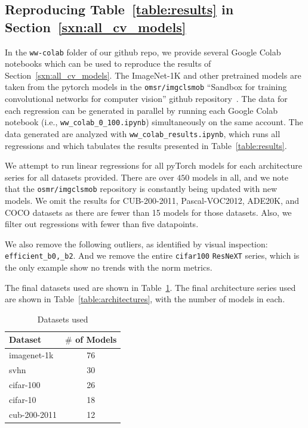 \subsection{Reproducing Table~\ref{table:results} in Section~\ref{sxn:all_cv_models} }

In the \texttt{ww-colab} folder of our github repo, we provide several Google Colab notebooks which can be used to reproduce the results of Section~\ref{sxn:all_cv_models}.
The ImageNet-1K and other pretrained models are taken from the pytorch models in the \texttt{omsr/imgclsmob} 
``Sandbox for training convolutional networks for computer vision'' github repository~\cite{osmr}.
The data for each regression can be generated in parallel by running each Google Colab notebook (i.e., \texttt{ww\_colab\_0\_100.ipynb}) simultaneously on the same account.
The data generated are analyzed with \texttt{ww\_colab\_results.ipynb}, which runs all regressions and which tabulates the results presented in Table~\ref{table:results}.

We attempt to run linear regressions for all pyTorch models for each architecture series for all datasets provided.  
There are over $450$ models in all, and we note that the \texttt{osmr/imgclsmob} repository is constantly being updated with new models.
We omit the results for CUB-200-2011, Pascal-VOC2012, ADE20K, and COCO datasets as there are fewer than 15 models for those datasets.  
Also, we filter out regressions with fewer than five datapoints.

We also remove the following outliers, as identified by visual inspection: \texttt{efficient\_b0,\_b2}.
And we remove the entire \texttt{cifar100} \texttt{ResNeXT} series, which is the only example show no trends with the norm metrics.


The final datasets used are shown in Table~\ref{table:datasets}.
The final architecture series used are shown in  Table~\ref{table:architectures}, with the number of models in each.

\begin{table}[t]
\small
\begin{center}
\begin{tabular}{|p{1in}|c|}
\hline
Dataset & $\#$ of Models \\
\hline
imagenet-1k   &  76 \\
svhn          &  30 \\
cifar-100     &  26 \\
cifar-10      &  18 \\
cub-200-2011  &  12 \\
\hline
\end{tabular}
\end{center}
\caption{Datasets used}
\label{table:datasets}
\end{table}

